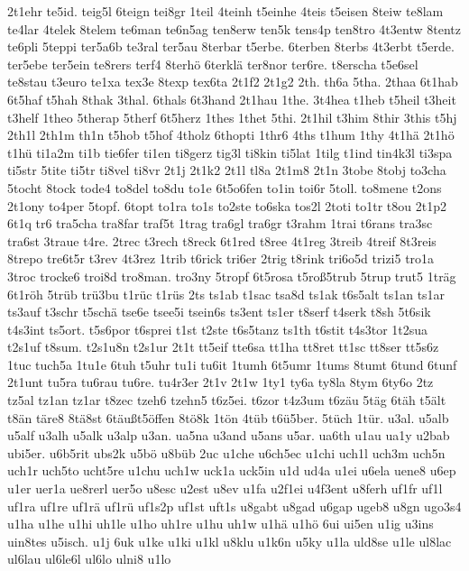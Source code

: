 {2t1ehr te5id.  teig5l 6teign tei8gr 1teil 4teinh t5einhe 4teis t5eisen
8teiw te8lam te4lar 4telek 8telem te6man te6n5ag ten8erw ten5k tens4p
ten8tro 4t3entw 8tentz te6pli 5teppi ter5a6b te3ral ter5au 8terbar
t5erbe.  6terben 8terbs 4t3erbt t5erde.  ter5ebe ter5ein te8rers terf4
8terh\"o 6terkl\"a ter8nor ter6re.  t8erscha t5e6sel te8stau
t3euro te1xa tex3e 8texp tex6ta 2t1f2 2t1g2 2th.  th6a 5tha.  2thaa
6t1hab 6t5haf t5hah 8thak 3thal.  6thals 6t3hand 2t1hau 1the.  3t4hea
t1heb t5heil t3heit t3helf 1theo 5therap 5therf 6t5herz 1thes 1thet
5thi.  2t1hil t3him 8thir 3this t5hj 2th1l 2th1m th1n t5hob t5hof
4tholz 6thopti 1thr6 4ths t1hum 1thy 4t1h\"a 2t1h\"o t1h\"u
ti1a2m ti1b tie6fer ti1en ti8gerz tig3l ti8kin ti5lat 1tilg t1ind
tin4k3l ti3spa ti5str 5tite ti5tr ti8vel ti8vr 2t1j 2t1k2 2t1l tl8a
2t1m8 2t1n 3tobe 8tobj to3cha 5tocht 8tock tode4 to8del to8du to1e
6t5o6fen to1in toi6r 5toll.  to8mene t2ons 2t1ony to4per 5topf.  6topt
to1ra 
to1s to2ste
to6ska tos2l 2toti to1tr t8ou 2t1p2 6t1q tr6 tra5cha
tra8far traf5t 1trag tra6gl tra6gr t3rahm 1trai t6rans tra3sc tra6st
3traue t4re.  2trec t3rech t8reck 6t1red t8ree 4t1reg 3treib 4treif
8t3reis 8trepo tre6t5r t3rev 4t3rez 1trib t6rick tri6er 2trig t8rink
tri6o5d trizi5 tro1a 3troc trocke6 troi8d tro8man.  tro3ny 5tropf
6t5rosa t5ro\ss  5trub 5trup trut5 1tr\"ag 6t1r\"oh
5tr\"ub tr\"u3bu t1r\"uc t1r\"us 2ts ts1ab t1sac tsa8d
ts1ak t6s5alt ts1an ts1ar ts3auf t3schr t5sch\"a tse6e tsee5i
tsein6s ts3ent ts1er t8serf t4serk t8sh 5t6sik t4s3int ts5ort.
t5s6por t6sprei 
t1st t2ste
t6s5tanz ts1th t6stit t4s3tor 1t2sua t2s1uf
t8sum.  t2s1u8n t2s1ur 2t1t tt5eif tte6sa tt1ha tt8ret tt1sc tt8ser
tt5s6z 1tuc tuch5a 1tu1e 6tuh t5uhr tu1i tu6it 1tumh 6t5umr 1tums
8tumt 6tund 6tunf 2t1unt tu5ra tu6rau tu6re.  tu4r3er 2t1v 2t1w 1ty1
ty6a ty8la 8tym 6ty6o 2tz tz5al tz1an tz1ar t8zec tzeh6 tzehn5 t6z5ei.
t6zor t4z3um t6z\"au 5t\"ag 6t\"ah t5\"alt t8\"an
t\"are8 8t\"a8st 6t\"au\ss  t5\"offen
8t\"o8k 1t\"on 4t\"ub t6\"u5ber. 5t\"uch 1t\"ur.
u3al.  u5alb u5alf u3alh u5alk u3alp u3an.  ua5na u3and u5ans u5ar.
ua6th u1au ua1y u2bab ubi5er.  u6b5rit ubs2k u5b\"o u8b\"ub 2uc
u1che u6ch5ec u1chi uch1l uch3m uch5n uch1r uch5to ucht5re u1chu uch1w
uck1a uck5in u1d ud4a u1ei u6ela uene8 u6ep u1er uer1a ue8rerl uer5o
u8esc u2est u8ev u1fa u2f1ei u4f3ent u8ferh uf1fr uf1l uf1ra uf1re
uf1r\"a uf1r\"u uf1s2p uf1st uft1s u8gabt u8gad u6gap ugeb8 u8gn
ugo3s4 u1ha u1he u1hi uh1le u1ho uh1re u1hu uh1w u1h\"a u1h\"o
6ui ui5en u1ig u3ins uin8tes u5isch.  u1j 6uk u1ke u1ki u1kl u8klu
u1k6n u5ky u1la uld8se u1le ul8lac ul6lau ul6le6l ul6lo ulni8 u1lo
}
